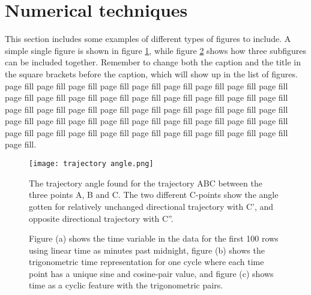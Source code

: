 
\section{Numerical techniques}

This section includes some examples of different types of figures to include. A simple single figure is shown in figure \ref{fig:trajectory_angle}, while figure \ref{fig:cyclic} shows how three subfigures can be included together. Remember to change both the caption and the title in the square brackets before the caption, which will show up in the list of figures. \\

\noindent page fill page fill page fill page fill page fill page fill page fill page fill page fill page fill page fill page fill page fill page fill page fill page fill page fill page fill page fill page fill page fill page fill page fill page fill page fill page fill page fill page fill page fill page fill page fill page fill page fill page fill page fill page fill page fill page fill page fill page fill page fill page fill page fill page fill page fill page fill.

\begin{figure}[H]
  \centering
  \texttt{[image: trajectory angle.png]}
  \caption[Trajectory angle]{The trajectory angle found for the trajectory ABC between the three points A, B and C. The two different C-points show the angle gotten for relatively unchanged directional trajectory with C', and opposite directional trajectory with C''.}
  \label{fig:trajectory_angle}
\end{figure}



\begin{figure}[H]
  \centering
  \hfill
  \hfill
  
  \caption[Time as a cyclic feature]{Figure (a) shows the time variable in the data for the first 100 rows using linear time as minutes past midnight, figure (b) shows the trigonometric time representation for one cycle where each time point has a unique sine and cosine-pair value, and figure (c) shows time as a cyclic feature with the trigonometric pairs.}
\label{fig:cyclic}
\end{figure}

